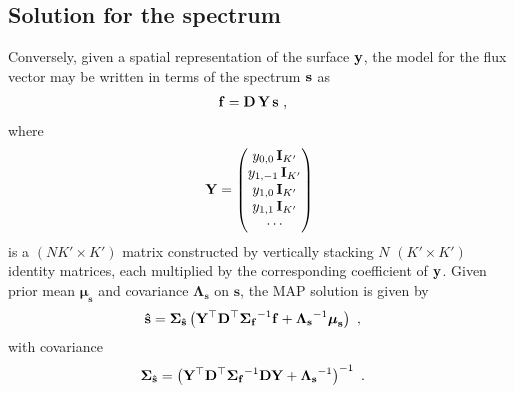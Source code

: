 \documentclass[modern]{aastex631}
\begin{document}
\subsection{Solution for the spectrum}
\label{sec:solve_s}
%
Conversely, given a spatial representation of the surface ${\mathbf{y}}$, the model for the flux vector may be written in terms of the spectrum ${\mathbf{s}}$ as
%
\begin{align}
    \label{eq:inverse:fs}
    {\ensuremath{\mathbf{f}}}
     & =
    {\mathbf{D}}
    \,
    {\mathbf{Y}}
    \,
    {\mathbf{s}}
    \hskip 0.33em,
\end{align}
%
where
%
\begin{align}
    \label{eq:inverse:Y}
    {\ensuremath{\mathbf{Y}}} =
    \begin{pmatrix}
        y_{0,0}\, {\mathbf{I}}_{K'} \\
        y_{1,-1}\, {\mathbf{I}}_{K'} \\
        y_{1,0}\, {\mathbf{I}}_{K'} \\
        y_{1,1}\, {\mathbf{I}}_{K'} \\
        \cdots
    \end{pmatrix}
\end{align}
%
is a $(NK' \times K')$ matrix constructed by vertically stacking $N$ $(K' \times K')$ identity matrices, each multiplied by the corresponding coefficient of ${\mathbf{y}}$. 
Given prior mean $\boldsymbol{\mu}_\mathbf{s}$ and covariance $\boldsymbol{\Lambda}_\mathbf{s}$ on $\mathbf{s}$, the MAP solution is given by
%
\begin{align}
    \label{eq:inverse:shat}
    {\ensuremath{\mathbf{\hat{s}}}} & =
    \boldsymbol{\Sigma}_\mathbf{\hat{s}}
    \left(
    {\mathbf{Y}}^\top{\ensuremath{\mathbf{D}}}^\top
    {\boldsymbol{\Sigma}_\mathbf{f}}^{-1}
    {\mathbf{f}}
    +
    {\boldsymbol{\Lambda}_\mathbf{s}}^{-1} \boldsymbol{\mu}_\mathbf{s}
    \right)
    \hskip 0.33em,
\end{align}
%
with covariance
%
\begin{align}
    \label{eq:inverse:scov}
    \boldsymbol{\Sigma}_\mathbf{\hat{s}} & =
    \left(
    {\mathbf{Y}}^\top{\ensuremath{\mathbf{D}}}^\top
    {\boldsymbol{\Sigma}_\mathbf{f}}^{-1}
    {\mathbf{D}}{\mathbf{Y}}
    +
    {\boldsymbol{\Lambda}_\mathbf{s}}^{-1}
    \right)^{-1}
    \hskip 0.33em.
\end{align}
\end{document}
